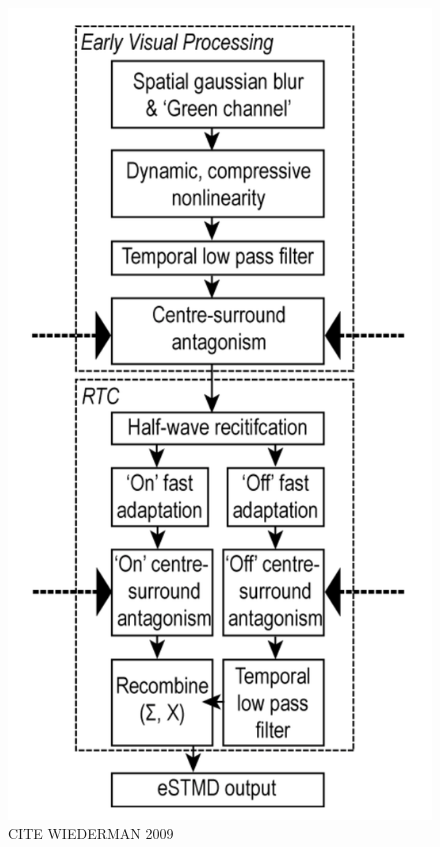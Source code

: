 \documentclass[a4paper,11pt]{article}
\begin{document}
\begin{figure}[h]
\centering
\includegraphics[scale = 0.5]{wiederman09}
\caption{CITE WIEDERMAN 2009}
\end{figure}
\end{document}
